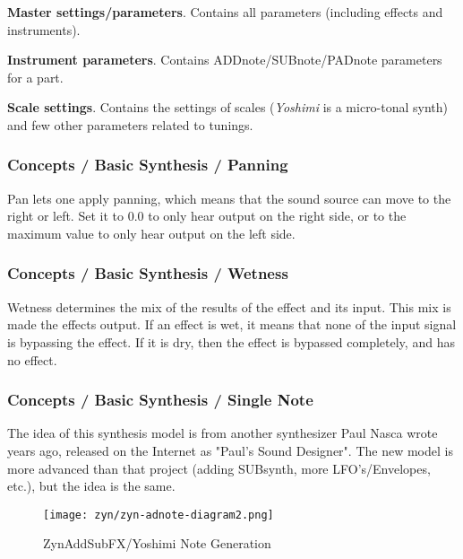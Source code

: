   \begin{enumber}
      \item \textbf{Master settings/parameters}.
         Contains all parameters (including effects and instruments).
      \item \textbf{Instrument parameters}.
         Contains ADDnote/SUBnote/PADnote parameters for a part.
      \item \textbf{Scale settings}.
         Contains the settings of scales (\textsl{Yoshimi}
         is a micro-tonal synth) and few other parameters related to
         tunings.
   \end{enumber}

\subsubsection{Concepts / Basic Synthesis / Panning}
\label{subsubsec:concepts_basics_panning}

   Pan lets one apply panning, which means that the sound source can move to
   the right or left. Set it to 0.0 to only hear output on the right side, or
   to the maximum value to only hear output on the left side.

\subsubsection{Concepts / Basic Synthesis / Wetness}
\label{subsubsec:concepts_basics_wetness}

   Wetness determines the mix of the results of the effect and its input.
   This mix is made the effects output. If an effect is wet, it means that
   none of the input signal is bypassing the effect. If it is dry, then
   the effect is bypassed completely, and has no effect.

\subsubsection{Concepts / Basic Synthesis / Single Note}
\label{subsubsec:concepts_basics_single_note}

   The idea of this synthesis model is from another synthesizer Paul Nasca
   wrote years ago, released on the Internet as "Paul's Sound
   Designer".  The new model is more advanced than that project
   (adding SUBsynth, more LFO's/Envelopes, etc.), but the idea is
   the same.

\begin{figure}[H]
   \centering 
   \texttt{[image: zyn/zyn-adnote-diagram2.png]}
   \caption{ZynAddSubFX/Yoshimi Note Generation}
   \label{fig:zynaddsubfx_note_generation}
\end{figure}
   

